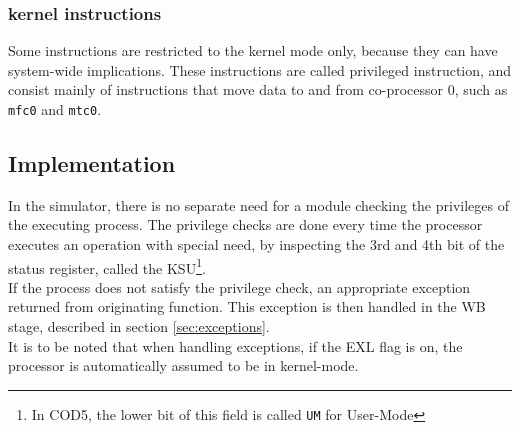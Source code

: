 \subsubsection{kernel instructions}
Some instructions are restricted to the kernel mode only, because they can have
system-wide implications. These instructions are called privileged
instruction, and consist mainly of instructions that move data to and from
co-processor 0, such as \texttt{mfc0} and \texttt{mtc0}.


\subsection{Implementation}
In the simulator, there is no separate need for a module checking the
privileges of the executing process. The privilege checks are done every time
the processor executes an operation with special need, by inspecting the 3rd
and 4th bit of the status register, called the KSU\footnote{In COD5, the lower
bit of this field is called \texttt{UM} for User-Mode\cite{COD5}}.\\
If the process does not satisfy the privilege check, an appropriate exception
returned from originating function. This exception is then handled in the WB
stage, described in section \ref{sec:exceptions}.\\
It is to be noted that when handling exceptions, if the EXL flag is on, the
processor is automatically assumed to be in kernel-mode\cite{see_mips_run}.
